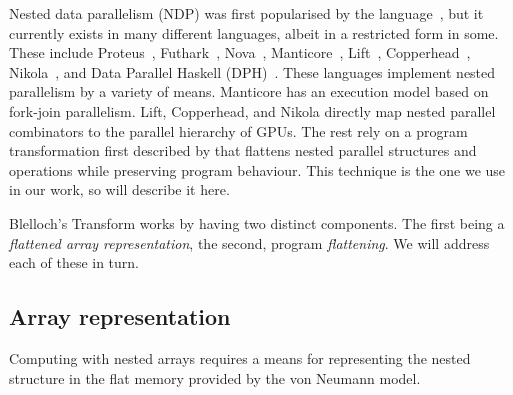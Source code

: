 Nested data parallelism (NDP) was first popularised by the \nesl{} language~\cite{Blelloch:nesl1995}, but it currently exists in many different languages, albeit in a restricted form in some. These include Proteus~\cite{proteus-frontiers95}, Futhark~\cite{Henriksen:2017futhark}, Nova~\cite{collins2013nova}, Manticore~\cite{Fluet:2007:manticore}, Lift~\cite{Steuwer:lift}, Copperhead~\cite{Catanzaro:copperhead}, Nikola~\cite{Mainland:nikola}, and Data Parallel Haskell (DPH)~\cite{Jones:2008uu}. These languages implement nested parallelism by a variety of means. Manticore has an execution model based on fork-join parallelism. Lift, Copperhead, and Nikola directly map nested parallel combinators to the parallel hierarchy of GPUs. The rest rely on a program transformation first described by \citet{Blelloch:compiling1988} that flattens nested parallel structures and operations while preserving program behaviour. This technique is the one we use in our work, so will describe it here.


Blelloch's Transform works by having two distinct components. The first being a \emph{flattened array representation}, the second, program \emph{flattening}. We will address each of these in turn.

\subsection{Array representation}
\label{sec:background-representation}

Computing with nested arrays requires a means for representing the nested structure in the flat memory provided by the von Neumann model.

